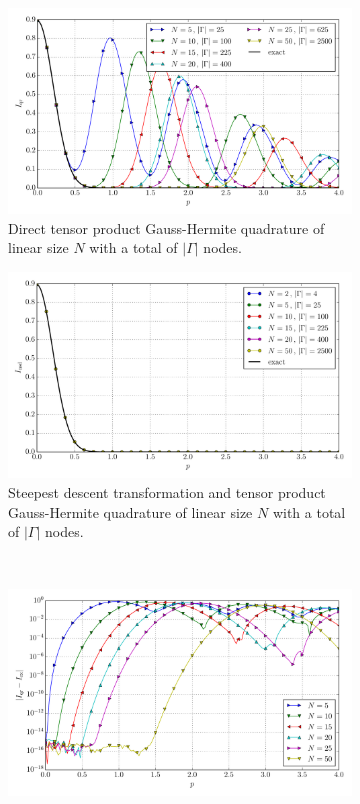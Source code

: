 \documentclass[a4paper,10pt]{article}
\begin{document}
\begin{figure}[ht!]
  \begin{subfigure}[t]{0.5\linewidth}
    \includegraphics[width=\linewidth]{./plots/tp_2d_conv_p_(0,0)_(0,0)_val_qr.pdf}
    \caption{Direct tensor product Gauss-Hermite quadrature of linear size $N$ with a total of $|\Gamma|$ nodes.}
    \label{fig:tp_2d_conv_p_00_00_val_qr}
  \end{subfigure}
  \begin{subfigure}[t]{0.5\linewidth}
    \includegraphics[width=\linewidth]{./plots/tp_2d_conv_p_(0,0)_(0,0)_val_nsd.pdf}
    \caption{Steepest descent transformation and tensor product Gauss-Hermite quadrature of linear size $N$ with a total of $|\Gamma|$ nodes.}
    \label{fig:tp_2d_conv_p_00_00_val_nsd}
  \end{subfigure} \\
  \begin{subfigure}[t]{0.5\linewidth}
    \includegraphics[width=\linewidth]{./plots/tp_2d_conv_p_(0,0)_(0,0)_err_qr.pdf}

\end{subfigure}
\end{figure}
\end{document}
